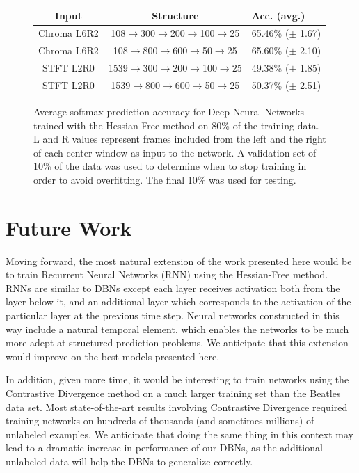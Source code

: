 \documentclass{article}
\begin{document}
\begin{figure}
  \begin{center}
\begin{tabular}{c|c|l}
Input & Structure & Acc. (avg.) \\
\hline
Chroma L6R2 & 108$\rightarrow$300$\rightarrow$200$\rightarrow$100$\rightarrow$25 & 65.46\% ($\pm$ 1.67) \\
Chroma L6R2 & 108$\rightarrow$800$\rightarrow$600$\rightarrow$50$\rightarrow$25 & 65.60\% ($\pm$ 2.10) \\
STFT L2R0 & 1539$\rightarrow$300$\rightarrow$200$\rightarrow$100$\rightarrow$25 & 49.38\% ($\pm$ 1.85) \\
STFT L2R0 & 1539$\rightarrow$800$\rightarrow$600$\rightarrow$50$\rightarrow$25 & 50.37\% ($\pm$ 2.51) \\
\end{tabular}
\end{center}
\caption{
  Average softmax prediction accuracy for Deep Neural Networks trained with the
  Hessian Free method on 80\% of the training data. L and R values represent
  frames included from the left and the right of each center window as input to
  the network. A validation set of 10\% of the data was used to determine when
  to stop training in order to avoid overfitting. The final 10\% was used for
  testing.
}

\end{figure}

\section{Future Work}
\label{sec:future_work}

Moving forward, the most natural extension of the work presented here would be
to train Recurrent Neural Networks (RNN) using the Hessian-Free method. RNNs
are similar to DBNs except each layer receives activation both from the layer
below it, and an additional layer which corresponds to the activation of the
particular layer at the previous time step. Neural networks constructed in this
way include a natural temporal element, which enables the networks to be much
more adept at structured prediction problems. We anticipate that this extension
would improve on the best models presented here.

In addition, given more time, it would be interesting to train networks using
the Contrastive Divergence method on a much larger training set than the
Beatles data set. Most state-of-the-art results involving Contrastive
Divergence required training networks on hundreds of thousands (and sometimes
millions) of unlabeled examples. We anticipate that doing the same thing in
this context may lead to a dramatic increase in performance of our DBNs, as the
additional unlabeled data will help the DBNs to generalize correctly.

\newpage



\end{document}
